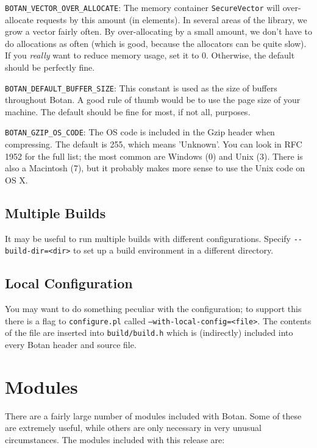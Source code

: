 \documentclass{article}
\newcommand{\filename}[1]{\texttt{#1}}
\newcommand{\type}[1]{\texttt{#1}}
\newcommand{\macro}[1]{\texttt{#1}}
\begin{document}
\macro{BOTAN\_VECTOR\_OVER\_ALLOCATE}: The memory container
\type{SecureVector} will over-allocate requests by this amount (in
elements). In several areas of the library, we grow a vector fairly often. By
over-allocating by a small amount, we don't have to do allocations as often
(which is good, because the allocators can be quite slow). If you \emph{really}
want to reduce memory usage, set it to 0. Otherwise, the default should be
perfectly fine.

\macro{BOTAN\_DEFAULT\_BUFFER\_SIZE}: This constant is used as the size of
buffers throughout Botan. A good rule of thumb would be to use the page size of
your machine. The default should be fine for most, if not all, purposes.

\macro{BOTAN\_GZIP\_OS\_CODE}: The OS code is included in the Gzip header when
compressing. The default is 255, which means 'Unknown'. You can look in RFC
1952 for the full list; the most common are Windows (0) and Unix (3). There is
also a Macintosh (7), but it probably makes more sense to use the Unix code on
OS X.

\subsection{Multiple Builds}

It may be useful to run multiple builds with different
configurations. Specify \verb|--build-dir=<dir>| to set up a build
environment in a different directory.

\subsection{Local Configuration}

You may want to do something peculiar with the configuration; to
support this there is a flag to \filename{configure.pl} called
\texttt{--with-local-config=<file>}. The contents of the file are
inserted into \filename{build/build.h} which is (indirectly) included
into every Botan header and source file.

\pagebreak

\section{Modules}

There are a fairly large number of modules included with Botan. Some
of these are extremely useful, while others are only necessary in very
unusual circumstances. The modules included with this release are:
\end{document}
